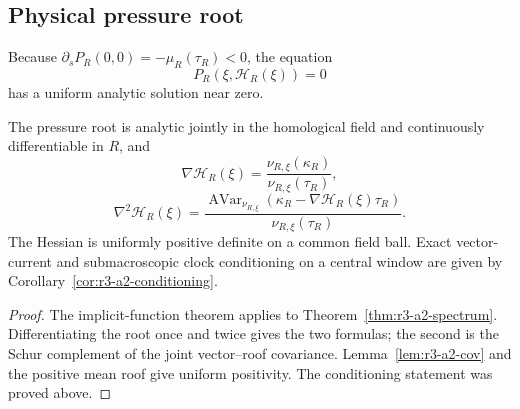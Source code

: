 \subsection{Physical pressure root}

Because \(\partial_sP_R(0,0)=-\mu_R(\tau_R)<0\), the equation
\[
 P_R(\xi,\mathcal H_R(\xi))=0
\]
has a uniform analytic solution near zero.

\begin{theorem}
\label{thm:r3-a2-main}
The pressure root is analytic jointly in the homological field and
continuously differentiable in \(R\), and
\[
 \nabla\mathcal H_R(\xi)
 =\frac{\nu_{R,\xi}(\kappa_R)}{\nu_{R,\xi}(\tau_R)},
\]
\[
 \nabla^2\mathcal H_R(\xi)
 =\frac{\operatorname{AVar}_{\nu_{R,\xi}}
 (\kappa_R-\nabla\mathcal H_R(\xi)\tau_R)}
 {\nu_{R,\xi}(\tau_R)}.
\]
The Hessian is uniformly positive definite on a common field ball.  Exact
vector-current and submacroscopic clock conditioning on a central window are
given by Corollary~\ref{cor:r3-a2-conditioning}.
\end{theorem}

\begin{proof}
The implicit-function theorem applies to
Theorem~\ref{thm:r3-a2-spectrum}.  Differentiating the root once and twice
gives the two formulas; the second is the Schur complement of the joint
vector--roof covariance.  Lemma~\ref{lem:r3-a2-cov} and the positive mean roof
give uniform positivity.  The conditioning statement was proved above.
\end{proof}
